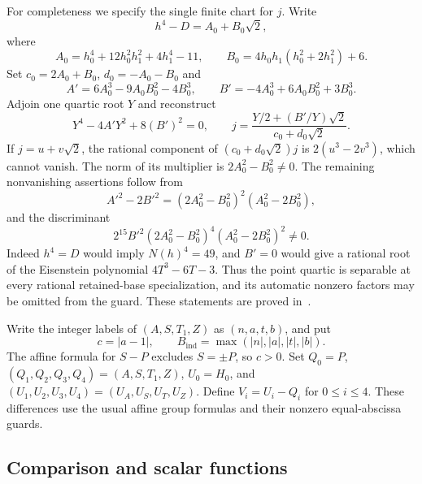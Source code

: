 \documentclass[11pt,a4paper]{article}
\begin{document}
For completeness we specify the single finite chart for $j$. Write
\[
 h^4-D=A_0+B_0\sqrt2,
\]
where
\[
 A_0=h_0^4+12h_0^2h_1^2+4h_1^4-11,\qquad
 B_0=4h_0h_1(h_0^2+2h_1^2)+6.
\]
Set $c_0=2A_0+B_0$, $d_0=-A_0-B_0$ and
\[
 A'=6A_0^3-9A_0B_0^2-4B_0^3,\qquad
 B'=-4A_0^3+6A_0B_0^2+3B_0^3.
\]
Adjoin one quartic root $Y$ and reconstruct
\begin{equation}\label{eq:quartic-chart}
 Y^4-4A'Y^2+8(B')^2=0,\qquad
 j=\frac{Y/2+(B'/Y)\sqrt2}{c_0+d_0\sqrt2}.
\end{equation}
If $j=u+v\sqrt2$, the rational component of
$(c_0+d_0\sqrt2)j$ is $2(u^3-2v^3)$, which cannot vanish.
The norm of its multiplier is $2A_0^2-B_0^2\ne0$. The remaining
nonvanishing assertions follow from
\[
 A'^2-2B'^2=(2A_0^2-B_0^2)^2(A_0^2-2B_0^2),
\]
and the discriminant
\[
 2^{15}B'^2(2A_0^2-B_0^2)^4(A_0^2-2B_0^2)^2\ne0.
\]
Indeed $h^4=D$ would imply $N(h)^4=49$, and $B'=0$ would give
a rational root of the Eisenstein polynomial $4T^3-6T-3$.
Thus the point quartic is separable at every rational retained-base
specialization, and its automatic nonzero factors may be omitted from
the guard. These statements are proved in~\cite{QuadraticCharts,SquarePredicate}.

Write the integer labels of $(A,S,T_1,Z)$ as $(n,a,t,b)$, and put
\[
 c=|a-1|,\qquad B_{\mathrm{ind}}=\max(|n|,|a|,|t|,|b|).
\]
The affine formula for $S-P$ excludes $S=\pm P$, so $c>0$. Set
$Q_0=P$, $(Q_1,Q_2,Q_3,Q_4)=(A,S,T_1,Z)$, $U_0=H_0$, and
$(U_1,U_2,U_3,U_4)=(U_A,U_S,U_T,U_Z)$. Define
$V_i=U_i-Q_i$ for $0\le i\le4$. These differences use the usual
affine group formulas and their nonzero equal-abscissa guards.

\subsection{Comparison and scalar functions}
\end{document}
